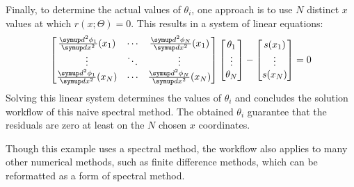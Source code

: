 Finally, to determine the actual values of $\theta_i$, one approach is to use $N$ distinct $x$ values at which $r(x; \Theta) = 0$.
This results in a system of linear equations: 
\begin{equation}\label{eq:spectral-linear-sys}
    \begin{bmatrix}
        \frac{\diff^2 \phi_1}{\diff x^2}(x_1) & \cdots & \frac{\diff^2 \phi_N}{\diff x^2}(x_1) \\
        \vdots & \ddots & \vdots \\
        \frac{\diff^2 \phi_1}{\diff x^2}(x_N) & \cdots & \frac{\diff^2 \phi_N}{\diff x^2}(x_N) \\
    \end{bmatrix}
    \begin{bmatrix}
        \theta_1 \\ \vdots \\ \theta_N
    \end{bmatrix}
    - 
    \begin{bmatrix}
        s(x_1) \\ \vdots \\ s(x_N)
    \end{bmatrix}
    = 0
\end{equation}
Solving this linear system determines the values of $\theta_i$ and concludes the solution workflow of this naive spectral method.
The obtained $\theta_i$ guarantee that the residuals are zero at least on the $N$ chosen $x$ coordinates.

Though this example uses a spectral method, the workflow also applies to many other numerical methods, such as finite difference methods, which can be reformatted as a form of spectral method.


